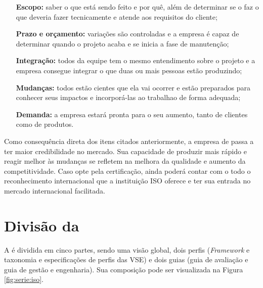 \begin{itemize}

\item [\textbf{Escopo:}] saber o que está sendo feito e por quê, além de determinar se  o \sw faz o que deveria fazer tecnicamente e atende aos requisitos do cliente;

\item [\textbf{Prazo e orçamento:}] variações são controladas e a empresa é capaz de determinar quando o projeto acaba e se inicia a fase de manutenção;

\item [\textbf{Integração:}] todos da equipe tem o mesmo entendimento sobre o projeto e a empresa consegue integrar o que duas ou mais pessoas estão produzindo;

\item [\textbf{Mudanças:}] todos estão cientes que ela vai ocorrer e estão preparados para conhecer seus impactos e incorporá-las ao trabalhao de forma adequada;

\item [\textbf{Demanda:}] a empresa estará pronta para o seu aumento, tanto de clientes como de produtos.

\end{itemize}

Como consequência direta dos itens citados anteriormente, a empresa de \sw passa a ter maior credibilidade no mercado. Sua capacidade de produzir mais rápido e reagir melhor às mudanças se refletem na melhora da qualidade e aumento da competitividade. Caso opte pela certificação, ainda poderá contar com o todo o reconhecimento internacional que a instituição ISO oferece e ter sua entrada no mercado internacional facilitada.

\section{Divisão da \iso}

A \iso é dividida em cinco partes, sendo uma visão global, dois perfis (\textit{Framework} e taxonomia e especificações de perfis das VSE) e dois guias (guia de avaliação e guia de gestão e engenharia). Sua composição pode ser visualizada na Figura \ref{fig:serie:iso}.


